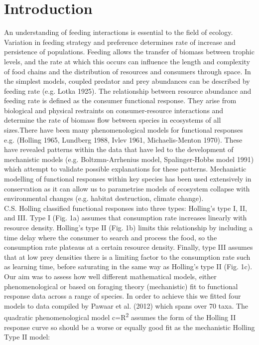 \documentclass[11pt]{article}
\begin{document}
	\section*{Introduction}
	An understanding of feeding interactions is essential to the field of ecology. Variation in feeding strategy and preference determines rate of increase and persistence of populations. Feeding allows the transfer of biomass between trophic levels, and the rate at which this occurs can influence the length and complexity of food chains and the distribution of resources and consumers through space. In the simplest models, coupled predator and prey abundances can be described by feeding rate (e.g. Lotka 1925). The relationship between resource abundance and feeding rate is defined as the consumer functional response. They arise from biological and physical restraints on consumer-resource interactions and determine the rate of biomass flow between species in ecosystems of all sizes.There have been many phenomenological models for functional responses e.g. (Holling 1965, Lundberg 1988, Ivlev 1961,  Michaelis-Menton 1970). These have revealed patterns within the data that have led to the development of mechanistic models (e.g. Boltzmn-Arrhenius model, Spalinger-Hobbs model 1991) which attempt to validate possible explanations for these patterns. Mechanistic modelling of functional responses within key species has been used extensively in conservation as it can allow us to parametrise models of ecosystem collapse with environmental changes (e.g. habitat destruction, climate change).\\
	
	C.S. Holling classified functional responses into three types: Holling's type I, II, and III. Type I (Fig. 1a) assumes that consumption rate increases linearly with resource density. Holling's type II (Fig. 1b) limits this relationship by including a time delay where the consumer to  search and process the food, so the consumption rate plateaus at a certain resource density. Finally, type III assumes that at low prey densities there is a limiting factor to the consumption rate such as learning time, before saturating in the same way as Holling's type II (Fig. 1c). Our aim was to assess how well different mathematical models, either phenomenological or based on foraging theory (mechanistic) fit to functional response data across a range of species. In order to achieve this we fitted four models to data compiled by Pawaar et al. (2012) which spans over 70 taxa. The quadratic phenomenological model c=R\textsuperscript{2}
	assumes the form of the Holling II response curve so should be a worse or equally good fit as the mechanistic Holling Type II model: 
	
\end{document}
